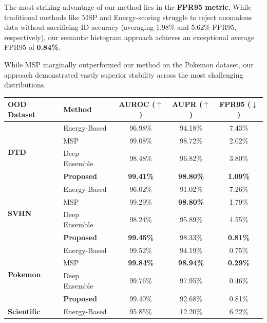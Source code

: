 \documentclass[oneside]{ctuthesis}
\begin{document}
The most striking advantage of our method lies in the \textbf{FPR95 metric}. While traditional methods like MSP and Energy-scoring struggle to reject anomalous data without sacrificing ID accuracy (averaging 1.98\% and 5.62\% FPR95, respectively), our semantic histogram approach achieves an exceptional average FPR95 of \textbf{0.84\%}.

While MSP marginally outperformed our method on the Pokemon dataset, our approach demonstrated vastly superior stability across the most challenging distributions.

\begin{table}[htbp]
    \centering
    \renewcommand{\arraystretch}{1.2} %
    \begin{tabular}{@{}llccc@{}}
        \toprule
        \textbf{OOD Dataset} & \textbf{Method} & \textbf{AUROC ($\uparrow$)} & \textbf{AUPR ($\uparrow$)} & \textbf{FPR95 ($\downarrow$)} \\
        \midrule
        \multirow{4}{*}{\textbf{DTD}} 
        & Energy-Based       & 96.98\% & 94.18\% & 7.43\% \\
        & MSP                & 99.08\% & 98.72\% & 2.02\% \\
        & Deep Ensemble      & 98.48\% & 96.82\% & 3.80\% \\
        & \textbf{Proposed}  & \textbf{99.41\%} & \textbf{98.80\%} & \textbf{1.09\%} \\
        \midrule
        \multirow{4}{*}{\textbf{SVHN}} 
        & Energy-Based       & 96.02\% & 91.02\% & 7.26\% \\
        & MSP                & 99.29\% & \textbf{98.80\%} & 1.79\% \\
        & Deep Ensemble      & 98.24\% & 95.89\% & 4.55\% \\
        & \textbf{Proposed}  & \textbf{99.45\%} & 98.33\% & \textbf{0.81\%} \\
        \midrule
        \multirow{4}{*}{\textbf{Pokemon}} 
        & Energy-Based       & 99.52\% & 94.19\% & 0.75\% \\
        & MSP                & \textbf{99.84\%} & \textbf{98.94\%} & \textbf{0.29\%} \\
        & Deep Ensemble      & 99.76\% & 97.95\% & 0.46\% \\
        & \textbf{Proposed}  & 99.40\% & 92.68\% & 0.81\% \\
        \midrule
        \multirow{4}{*}{\textbf{Scientific}} 
        & Energy-Based       & 95.85\% & 12.20\% & 6.22\% \\

\end{tabular}
\end{table}
\end{document}
